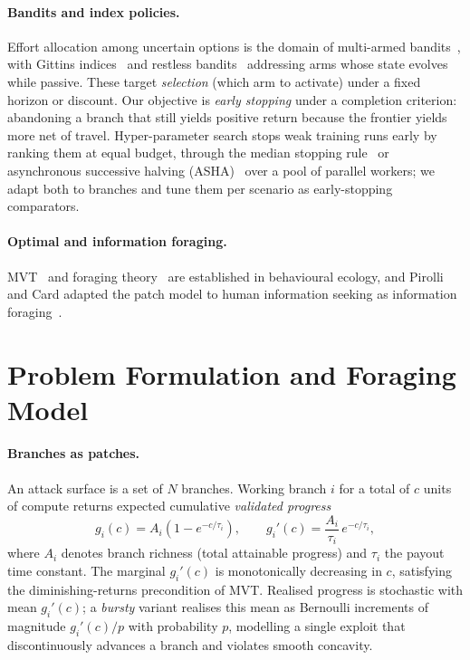 \documentclass[runningheads]{llncs}
\begin{document}
\paragraph{Bandits and index policies.}
Effort allocation among uncertain options is the domain of multi-armed
bandits~\cite{auer2002finite}, with Gittins indices~\cite{gittins1979bandit} and
restless bandits~\cite{whittle1988restless} addressing arms whose state evolves while
passive. These target \emph{selection} (which arm to activate) under a fixed horizon or discount.
Our objective is \emph{early stopping} under a completion criterion: abandoning a branch
that still yields positive return because the frontier yields more net of travel.
Hyper-parameter search stops weak training runs early by ranking them at equal budget,
through the median stopping rule~\cite{golovin2017vizier} or asynchronous successive
halving (ASHA)~\cite{li2020asha} over a pool of parallel workers; we adapt both to branches
and tune them per scenario as early-stopping comparators.

\paragraph{Optimal and information foraging.}
MVT~\cite{charnov1976optimal} and foraging theory~\cite{stephens1986foraging} are
established in behavioural ecology, and Pirolli and Card adapted the patch model to human
information seeking as information foraging~\cite{pirolli1999information}.

\section{Problem Formulation and Foraging Model}
\label{sec:model}

\paragraph{Branches as patches.}
An attack surface is a set of $N$ branches. Working branch $i$ for a total of $c$
units of compute returns expected cumulative \emph{validated progress}
\begin{equation}
g_i(c) = A_i\left(1 - e^{-c/\tau_i}\right),
\qquad
g_i'(c) = \frac{A_i}{\tau_i}\, e^{-c/\tau_i},
\label{eq:patch}
\end{equation}
where $A_i$ denotes branch richness (total attainable progress) and $\tau_i$ the payout
time constant. The marginal $g_i'(c)$ is monotonically decreasing in $c$, satisfying the
diminishing-returns precondition of MVT. Realised progress is stochastic with mean
$g_i'(c)$; a \emph{bursty} variant realises this mean as Bernoulli increments of
magnitude $g_i'(c)/p$ with probability $p$, modelling a single exploit that
discontinuously advances a branch and violates smooth concavity.
\end{document}
